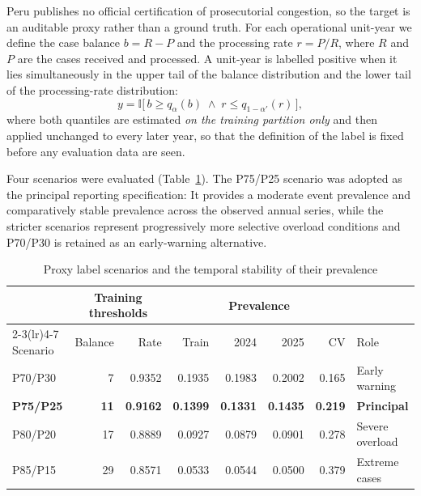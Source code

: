 \documentclass[sn-vancouver,Numbered]{sn-jnl}
\begin{document}
Peru publishes no official certification of prosecutorial congestion, so the target is an auditable proxy rather than a ground truth. For each operational unit-year we define the case balance $b = R - P$ and the processing rate $r = P/R$, where $R$ and $P$ are the cases received and processed. A unit-year is labelled positive when it lies simultaneously in the upper tail of the balance distribution and the lower tail of the processing-rate distribution:
\begin{equation}
y = \mathbb{I}\big[\, b \geq q_{\alpha}(b) \;\wedge\; r \leq q_{1-\alpha'}(r) \,\big],
\end{equation}
where both quantiles are estimated \emph{on the training partition only} and then applied unchanged to every later year, so that the definition of the label is fixed before any evaluation data are seen.

Four scenarios were evaluated (Table~\ref{tab:scenarios}). The P75/P25 scenario was adopted as the principal reporting specification: It provides a moderate event prevalence and comparatively stable prevalence across the observed annual series, while the stricter scenarios represent progressively more selective overload conditions and P70/P30 is retained as an early-warning alternative.

\begin{table}[h]
\caption{Proxy label scenarios and the temporal stability of their prevalence}\label{tab:scenarios}
\begin{tabular}{lrrrrrrl}
\toprule
& \multicolumn{2}{c}{Training thresholds} & \multicolumn{4}{c}{Prevalence} & \\
\cmidrule(lr){2-3}\cmidrule(lr){4-7}
Scenario & Balance & Rate & Train & 2024 & 2025 & CV & Role \\
\midrule
P70/P30 & 7 & 0.9352 & 0.1935 & 0.1983 & 0.2002 & 0.165 & Early warning \\
\textbf{P75/P25} & \textbf{11} & \textbf{0.9162} & \textbf{0.1399} & \textbf{0.1331} & \textbf{0.1435} & \textbf{0.219} & \textbf{Principal} \\
P80/P20 & 17 & 0.8889 & 0.0927 & 0.0879 & 0.0901 & 0.278 & Severe overload \\
P85/P15 & 29 & 0.8571 & 0.0533 & 0.0544 & 0.0500 & 0.379 & Extreme cases \\
\bottomrule
\end{tabular}
\end{table}
\end{document}
